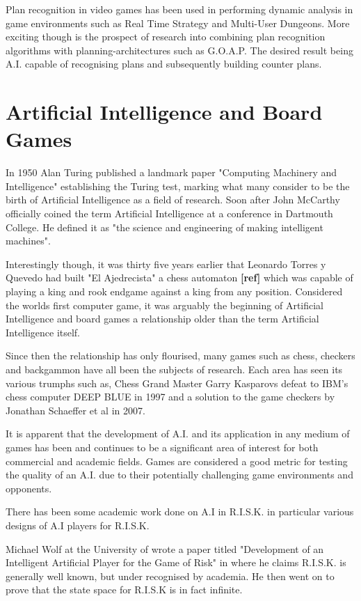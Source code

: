 \documentclass[parskip]{cs4rep}
\begin{document}
Plan recognition in video games has been used in performing dynamic analysis in game environments such as Real Time Strategy \cite{conf/aiide/SynnaeveB11} and Multi-User Dungeons\cite{Albrecht:1998:BMK:598277.598308}. More exciting though is the prospect of research into combining plan recognition algorithms with planning-architectures such as G.O.A.P. The desired result being A.I. capable of recognising plans and subsequently building counter plans.

\section{Artificial Intelligence and Board Games}

In 1950 Alan Turing published a landmark paper "Computing Machinery and Intelligence" establishing the Turing test, marking what many consider to be the birth of Artificial Intelligence as a field of research. Soon after John McCarthy officially coined the term Artificial Intelligence at a conference in Dartmouth College. He defined it as "the science and engineering of making intelligent machines".

Interestingly though, it was thirty five years earlier that Leonardo Torres y Quevedo had built "El Ajedrecista" a chess automaton \textbf{[ref]} which was capable of playing a king and rook endgame against a king from any position. Considered the worlds first computer game, it was arguably the beginning of Artificial Intelligence and board games a relationship older than the term Artificial Intelligence itself. 

Since then the relationship has only flourised, many games such as chess, checkers and backgammon have all been the subjects of research. Each area has seen its various trumphs such as, Chess Grand Master Garry Kasparovs defeat to IBM's chess computer DEEP BLUE in 1997 and a solution to the game checkers by Jonathan Schaeffer et al in 2007.

It is apparent that the development of A.I. and its application in any medium of games has been and continues to be a significant area of interest for both commercial and academic fields. Games are considered a good metric for testing the quality of an A.I. due to their potentially challenging game environments and opponents.

There has been some academic work done on A.I in R.I.S.K. in particular various designs of A.I players for R.I.S.K.

Michael Wolf at the University of  wrote a paper titled "Development of an Intelligent Artificial Player for the Game of Risk" \cite{michaelwolf} in where he claims R.I.S.K. is generally well known, but under recognised by academia. He then went on to prove that the state space for R.I.S.K is in fact infinite. 
\end{document}

